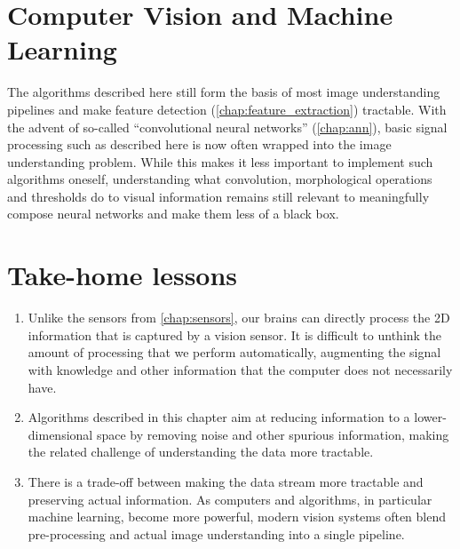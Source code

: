 \section{Computer Vision and Machine Learning}
\label{sec:cvml}
The algorithms described here still form the basis of most image understanding pipelines and make feature detection (\cref{chap:feature_extraction}) tractable. With the advent of so-called ``convolutional neural networks'' (\cref{chap:ann}), basic signal processing such as described here is now often wrapped into the image understanding problem. While this makes it less important to implement such algorithms oneself, understanding what convolution, morphological operations and thresholds do to visual information remains still relevant to meaningfully compose neural networks and make them less of a black box.


\section*{Take-home lessons}
\begin{enumerate}
\item Unlike the sensors from \cref{chap:sensors}, our brains can directly process the 2D information that is captured by a vision sensor. It is difficult to unthink the amount of processing that we perform automatically, augmenting the signal with knowledge and other information that the computer does not necessarily have.
\item  Algorithms described in this chapter aim at reducing information to a lower-dimensional space by removing noise and other spurious information, making the related challenge of understanding the data more tractable. 
\item There is a trade-off between making the data stream more tractable and preserving actual information. As computers and algorithms, in particular machine learning, become more powerful, modern vision systems often blend pre-processing and actual image understanding into a single pipeline. 
\end{enumerate}


